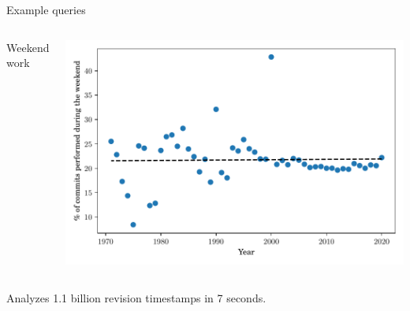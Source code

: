 \documentclass[aspectratio=169,xcolor=table]{beamer}
\begin{document}
    \begin{frame}[fragile]{Example queries}
        \begin{columns}
            \begin{block}{Weekend work}
                \inputminted[fontsize=\tiny, firstline=3]{sql}{../codesamples/graph-dataset/weekend-work.sql}
            \end{block}
            \begin{center}
                \includegraphics[width=\linewidth]{../img/graph-dataset/weekend-work}
            \end{center}
        \end{columns}

        \begin{block}{}
            Analyzes 1.1 billion revision timestamps in 7 seconds.
        \end{block}
    \end{frame}


\end{document}
